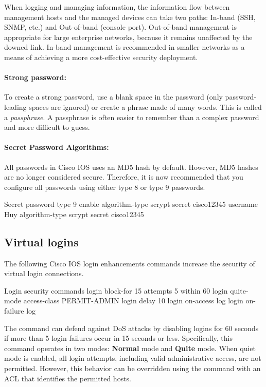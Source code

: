 When logging and managing information, the information flow between management hosts and the managed devices can take two paths: In-band (SSH, SNMP, etc.) and Out-of-band (console port). Out-of-band management is appropriate for large enterprise networks, because it remains unaffected by the downed link. In-band management is recommended in smaller networks as a means of achieving a more cost-effective security deployment.

\paragraph{Strong password:} 

To create a strong password, use a blank space in the password (only password-leading spaces are ignored) or create a phrase made of many words. This is called a \emph{passphrase}. A passphrase is often easier to remember than a complex password and more difficult to guess.

\paragraph{Secret Password Algorithms:} 

All passwords in Cisco IOS uses an MD5 hash by default. However, MD5 hashes are no longer considered secure. Therefore, it is now recommended that you configure all passwords using either type 8  or type 9  passwords.

\begin{sexylisting}{Secret password type 9}
enable algorithm-type scrypt secret cisco12345
username Huy algorithm-type scrypt secret cisco12345
\end{sexylisting}


\subsection{Virtual logins}

The following Cisco IOS login enhancements commands increase the security of virtual login connections.

\begin{sexylisting}{Login security commands}
login block-for 15 attempts 5 within 60
login quite-mode access-class PERMIT-ADMIN
login delay 10
login on-access log
login on-failure log
\end{sexylisting}

The  command can defend against DoS attacks by disabling logins for 60 seconds if more than 5 login failures occur in 15 seconds or less. Specifically, this command operates in two modes: \textbf{Normal} mode and \textbf{Quite} mode. When quiet mode is enabled, all login attempts, including valid administrative access, are not permitted. However, this behavior can be overridden using the  command with an ACL that identifies the permitted hosts. \\

